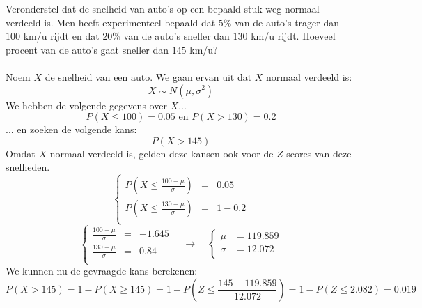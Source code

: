 \documentclass[main.tex]{subfiles}
\begin{document}
\begin{oef}
  Veronderstel dat de snelheid van auto's op een bepaald stuk weg normaal verdeeld is. Men
heeft experimenteel bepaald dat $5\%$ van de auto's trager dan $100$ km/u rijdt en dat $20\%$ van de
auto's sneller dan $130$ km/u rijdt. Hoeveel procent van de auto's gaat sneller dan $145$ km/u?\\\\
  Noem $X$ de snelheid van een auto.
  We gaan ervan uit dat $X$ normaal verdeeld is:
  \[ X \sim N(\mu,\sigma^{2}) \]
  We hebben de volgende gegevens over $X$...
  \[ P(X \le 100) = 0.05 \text{ en } P(X > 130) = 0.2 \]
  ... en zoeken de volgende kans:
  \[ P(X > 145) \]
  Omdat $X$ normaal verdeeld is, gelden deze kansen ook voor de $Z$-scores van deze snelheden.
  \[ 
  \left\{
    \begin{array}{rcl}
      P(X \le \frac{100-\mu}{\sigma}) &=& 0.05\\
      P(X \le \frac{130-\mu}{\sigma}) &=& 1-0.2\\
    \end{array}
  \right.
  \]
  \[
  \left\{
    \begin{array}{rcl}
      \frac{100-\mu}{\sigma} &=& -1.645\\
      \frac{130-\mu}{\sigma} &=& 0.84\\
    \end{array}
  \right.
  \quad\longrightarrow\quad
  \left\{
    \begin{array}{rl}
      \mu &= 119.859\\
      \sigma &= 12.072\\
    \end{array}
  \right.
  \]
  We kunnen nu de gevraagde kans berekenen:
  \[ P(X > 145) = 1-P(X \ge 145) = 1-P\left(Z \le \frac{145-119.859}{12.072}\right) = 1-P(Z\le 2.082) = 0.019 \]
\end{oef}
\end{document}
